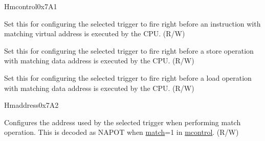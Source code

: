 \begin{register}{H}{mcontrol}{0x7A1}
\begin{regdesc}
\begin{reglist}
\label{fielddesc:MCONTROLEXECUTE}\item [execute] Set this for configuring the selected trigger to fire right before an instruction with matching virtual address is executed by the CPU. (R/W)
\label{fielddesc:MCONTROLSTORE}\item [store] Set this for configuring the selected trigger to fire right before a store operation with matching data address is executed by the CPU. (R/W)
\label{fielddesc:MCONTROLLOAD}\item [load] Set this for configuring the selected trigger to fire right before a load operation with matching data address is executed by the CPU. (R/W)
\end{reglist}\end{regdesc}
\end{register}

\begin{register}{H}{maddress}{0x7A2}\label{regdesc:MADDRESS}
%
\regnewline%
\begin{regdesc}\begin{reglist}
\label{fielddesc:MADDRESS}\item [maddress] Configures the address used by the selected trigger when performing match operation. This is decoded as NAPOT when \hyperref[fielddesc:MCONTROLMATCH]{match}=1 in \hyperref[regdesc:MCONTROL]{mcontrol}. (R/W)
\end{reglist}\end{regdesc}
\end{register}
